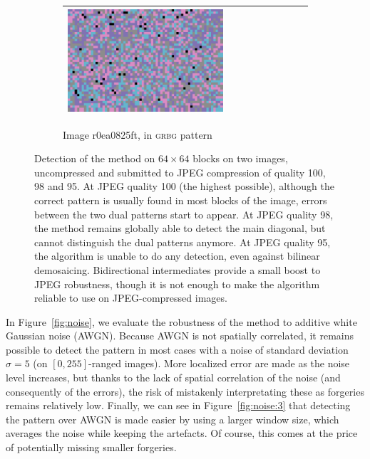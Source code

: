 \documentclass{ipol}
\begin{document}
\begin{figure}[ht]
\begin{subfigure}[t]{\linewidth}
\begin{tabular}{ccccccccc}
                \includegraphics[width=\s]{images/night/VNG/bid_j95_64_grids.png}\\
                \bottomrule
        \end{tabular}
        \caption{Image r0ea0825ft, in \textsc{grbg} pattern}
\end{subfigure}
\caption{Detection of the method on $64\times64$ blocks on two images, uncompressed and submitted to JPEG compression of quality 100, 98 and 95. At JPEG quality 100 (the highest possible), although the correct pattern is usually found in most blocks of the image, errors between the two dual patterns start to appear. At JPEG quality 98, the method remains globally able to detect the main diagonal, but cannot distinguish the dual patterns anymore. At JPEG quality 95, the algorithm is unable to do any detection, even against bilinear demosaicing. Bidirectional intermediates provide a small boost to JPEG robustness, though it is not enough to make the algorithm reliable to use on JPEG-compressed images.}
\label{fig:jpeg}
\end{figure}

In Figure~\ref{fig:noise}, we evaluate the robustness of the method to additive white Gaussian noise (AWGN). Because AWGN is not spatially correlated, it remains possible to detect the pattern in most cases with a noise of standard deviation $\sigma=5$ (on $[0, 255]$-ranged images). More localized error are made as the noise level increases, but thanks to the lack of spatial correlation of the noise (and consequently of the errors), the risk of mistakenly interpretating these as forgeries remains relatively low. Finally, we can see in Figure~\ref{fig:noise:3} that detecting the pattern over AWGN is made easier by using a larger window size, which averages the noise while keeping the artefacts. Of course, this comes at the price of potentially missing smaller forgeries.
\end{document}
